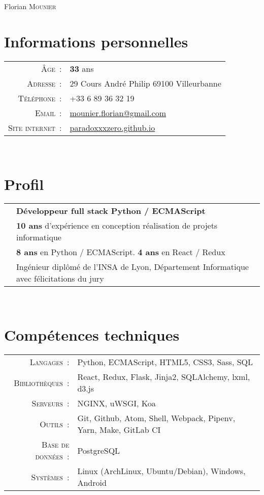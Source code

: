\documentclass[a4paper,10pt]{article}
\begin{document}
  \pagestyle{empty}
  \par{\centering
    {\Huge Florian \textsc{Mounier}
    }\bigskip\par}

  \section{Informations personnelles}
  \begin{tabular}{rl}
    \textsc{Âge :}
      & \textbf{33} ans \\
    \textsc{Adresse :}
      & 29 Cours André Philip 69100 Villeurbanne \\
    \textsc{Téléphone :}
      & +33 6 89 36 32 19 \\
    \textsc{Email :}
      & \href{mailto:mounier.florian@gmail.com}{mounier.florian@gmail.com} \\
    \textsc{Site internet :}
      & \href{http://paradoxxxzero.github.com}{paradoxxxzero.github.io} \\
  \end{tabular} \\

  \section{Profil}
  \begin{tabular}{rl}
    & \textbf {Développeur full stack Python / ECMAScript} \\
    & \textbf{10 ans} d’expérience en conception réalisation de projets informatique \\
    & \textbf{8 ans} en Python / ECMAScript. \textbf{4 ans} en React / Redux \\
    & Ingénieur diplômé de l’INSA de Lyon,
    Département Informatique avec félicitations du jury \\
  \end{tabular} \\

  \section{Compétences techniques}
  \begin{tabular}{rl}
    \textsc{Langages :}
      & Python, ECMAScript, HTML5, CSS3, Sass, SQL \\
    \textsc{Bibliothèques :}
      & React, Redux, Flask, Jinja2, SQLAlchemy, lxml, d3.js \\
    \textsc{Serveurs :}
      & NGINX, uWSGI, Koa \\
    \textsc{Outils :}
      & Git, Github, Atom, Shell, Webpack, Pipenv, Yarn, Make, GitLab CI \\
    \textsc{Base de données :}
      & PostgreSQL \\
    \textsc{Systèmes :}
      & Linux (ArchLinux, Ubuntu/Debian), Windows, Android \\
  \end{tabular} \\
\end{document}
